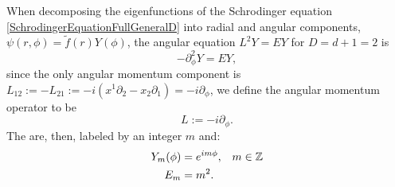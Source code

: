     
    


When decomposing the eigenfunctions of the Schrodinger equation \eqref{SchrodingerEquationFullGeneralD} into radial and angular components, $\psi(r, \phi) = \tilde f(r) Y(\phi)$, the angular equation $L^2 Y = EY$ for $D = d+1 = 2$ is 
\begin{equation}
    - \partial_\phi^2 Y = E Y,
\end{equation}
since the only angular momentum component is $L_{12} := - L_{21} :=-i(x^1 \partial_2  - x_2 \partial_1) = - i \partial_\phi$, we define the angular momentum operator to be
\begin{equation}\label{equationAngularMomentumD2d1PartialPhi}
    L:= -i \partial_\phi   . 
\end{equation}
The  are, then, labeled by an integer $m$ and:
\begin{align}
    Y_m(\phi) &= e^{im \phi}, & m \in \ZZ\\
    E_m &= m^2.
\end{align}

\lin

